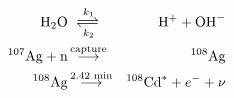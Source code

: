 \documentclass[10pt]{article}
\begin{document}
\def\longrightharpoonup{\relbar\joinrel\rightharpoonup}
\def\longleftharpoondown{\leftharpoondown\joinrel\relbar}

\def\longrightleftharpoons{
  \mathop{
    \vcenter{
      \hbox{
	\ooalign{
	  \raise1pt\hbox{$\longrightharpoonup\joinrel$}\crcr
	  \lower1pt\hbox{$\longleftharpoondown\joinrel$}
	}
      }
    }
  }
}

\newcommand{\rates}[2]{\displaystyle
  \mathrel{\longrightleftharpoons^{#1\mathstrut}_{#2}}}

\begin{eqnarray}
{\rm H}_2{\rm O} & \rates{k_{\rm 1}}{k_{\rm 2}} &{\rm H}^+ + {\rm OH}^-\\
^{107}{\rm Ag} + {\rm n}
 & \displaystyle \mathop{\longrightarrow}^\textrm{\scriptsize{capture}}
 & ^{108}{\rm Ag}\\
^{108}{\rm Ag}
 & \displaystyle \mathop{\longrightarrow}^\textrm{\scriptsize{2.42~min}}
 & ^{108}{\rm Cd}^* + e^- + \nu\\
\end{eqnarray}
\end{document}
